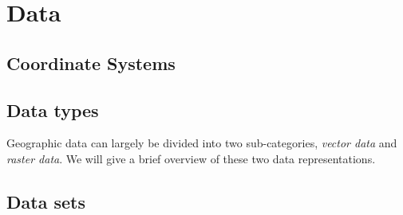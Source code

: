\section{Data}%
\label{sec:data}



\subsection{Coordinate Systems}


\subsection{Data types}

Geographic data can largely be divided into two sub-categories, \textit{vector data} and \textit{raster data}.
We will give a brief overview of these two data representations.



%
\label{sec:raster-data}


\subsection{Data sets}






